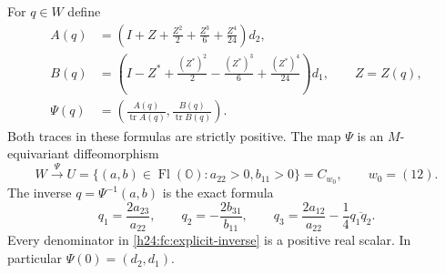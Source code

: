 \begin{theorem}
\label{h24:fc:open-cell}
For $q\in W$ define
\begin{equation}
 \begin{aligned}
 A(q)&=\left(I+Z+\frac{Z^2}{2}+\frac{Z^3}{6}
                       +\frac{Z^4}{24}\right)d_2,\\
 B(q)&=\left(I-Z^*+\frac{(Z^*)^2}{2}-\frac{(Z^*)^3}{6}
                       +\frac{(Z^*)^4}{24}\right)d_1,
       \qquad Z=Z(q),\\
 \Psi(q)&=\left(\frac{A(q)}{\operatorname{tr}A(q)},
               \frac{B(q)}{\operatorname{tr}B(q)}\right).
 \end{aligned}
 \label{h24:fc:explicit-chart}
\end{equation}
Both traces in these formulas are strictly positive. The map $\Psi$
is an $M$-equivariant diffeomorphism
\begin{equation}
 W\xrightarrow{\ \Psi\ }
 U=\{(a,b)\in\operatorname{Fl}(\mathbb O):a_{22}>0, b_{11}>0\}
   =C_{w_0},\qquad w_0=(12).
 \label{h24:fc:open-cell-locus}
\end{equation}
The inverse $q=\Psi^{-1}(a,b)$ is the exact formula
\begin{equation}
 \boxed{\quad
 q_1=\frac{2a_{23}}{a_{22}},\qquad
 q_2=-\frac{2b_{31}}{b_{11}},\qquad
 q_3=\frac{2a_{12}}{a_{22}}-\frac14\overline{q_1q_2}.
 \quad}
 \label{h24:fc:explicit-inverse}
\end{equation}
Every denominator in \eqref{h24:fc:explicit-inverse} is a positive
real scalar. In particular $\Psi(0)=(d_2,d_1)$.
\end{theorem}

